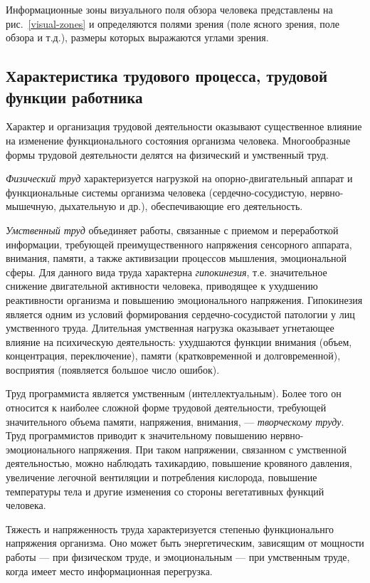 Информационные зоны визуального поля обзора человека представлены на рис.~\ref{visual-zones} и определяются полями зрения (поле ясного зрения, поле обзора и т.д.), размеры которых выражаются углами зрения.

\subsection{Характеристика трудового процесса, трудовой функции работника}
Характер и организация трудовой деятельности оказывают существенное влияние на изменение функционального состояния организма человека. Многообразные формы трудовой деятельности делятся на физический и умственный труд.

\emph{Физический труд} характеризуется нагрузкой на опорно\hyp{}двигательный аппарат и функциональные системы организма человека (сердечно\hyp{}сосудистую, нервно\hyp{}мышечную, дыхательную и др.), обеспечивающие его деятельность.

\emph{Умственный труд} объединяет работы, связанные с приемом и переработкой информации, требующей преимущественного напряжения сенсорного аппарата, внимания, памяти, а также активизации процессов мышления, эмоциональной сферы. Для данного вида труда характерна \emph{гипокинезия}, т.е. значительное снижение двигательной активности человека, приводящее к ухудшению реактивности организма и повышению эмоционального напряжения. Гипокинезия является одним из условий формирования сердечно-сосудистой патологии у лиц умственного труда. Длительная умственная нагрузка оказывает угнетающее влияние на психическую деятельность: ухудшаются функции внимания (объем, концентрация, переключение), памяти (кратковременной и долговременной), восприятия (появляется большое число ошибок).

Труд программиста является умственным (интеллектуальным). Более того он относится к наиболее сложной форме трудовой деятельности, требующей значительного объема памяти, напряжения, внимания, --- \emph{творческому труду}. Труд программистов приводит к значительному повышению нервно-эмоционального напряжения. При таком напряжении, связанном с умственной деятельностью, можно наблюдать тахикардию, повышение кровяного давления, увеличение легочной вентиляции и потребления кислорода, повышение температуры тела и другие изменения со стороны вегетативных функций человека.

Тяжесть и напряженность труда характеризуется степенью функциональнго напряжения организма. Оно может быть энергетическим, зависящим от мощности работы --- при физическом труде, и эмоциональным --- при
умственным труде, когда имеет место информационная перегрузка.

